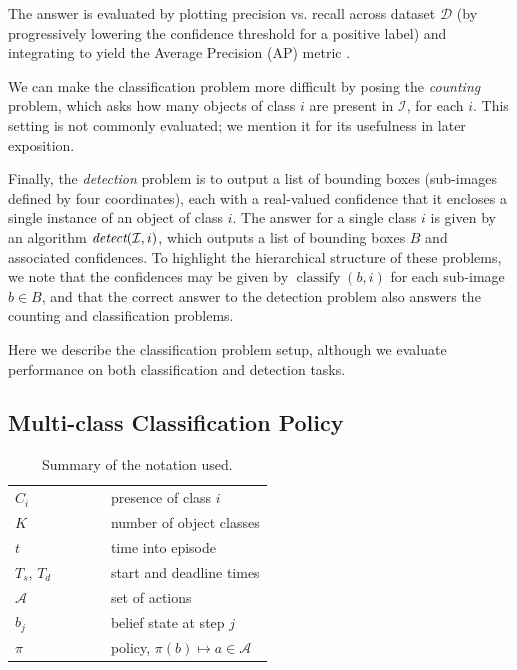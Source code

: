 \documentclass[runningheads]{llncs}
\begin{document}
The answer is evaluated by plotting precision vs. recall across dataset $\mathcal{D}$ (by progressively lowering the confidence threshold for a positive label) and integrating to yield the Average Precision (AP) metric \cite{pascal-voc-2010}.

We can make the classification problem more difficult by posing the \emph{counting} problem, which asks how many objects of class $i$ are present in $\mathcal{I}$, for each $i$.
This setting is not commonly evaluated; we mention it for its usefulness in later exposition.

Finally, the \emph{detection} problem is to output a list of bounding boxes (sub-images defined by four coordinates), each with a real-valued confidence that it encloses a single instance of an object of class $i$.
The answer for a single class $i$ is given by an algorithm $\emph{detect}(\mathcal{I},i)$, which outputs a list of bounding boxes $B$ and associated confidences.
To highlight the hierarchical structure of these problems, we note that the confidences may be given by $\operatorname{classify}(b,i)$ for each sub-image $b \in B$, and that the correct answer to the detection problem also answers the counting and classification problems.

Here we describe the classification problem setup, although we evaluate performance on both classification and detection tasks.

\subsection{Multi-class Classification Policy}

\begin{table}
\centering
\caption{Summary of the notation used.}
\label{tab:notation}
\begin{tabular}{|l|l|}
	\hline
	$C_i$         & presence of class $i$ \\ 
	$K$           & number of object classes \\ 
	$t$           & time into episode \\ 
	$T_s$, $T_d$  & start and deadline times \\ 
	$\mathcal{A}$ & set of actions \\ 
	$b_j$        	& belief state at step $j$ \\ 
	$\pi$         & policy, $\pi(b) \mapsto a \in \mathcal{A}$ \\ 
	\hline
\end{tabular}\end{table}
\end{document}
